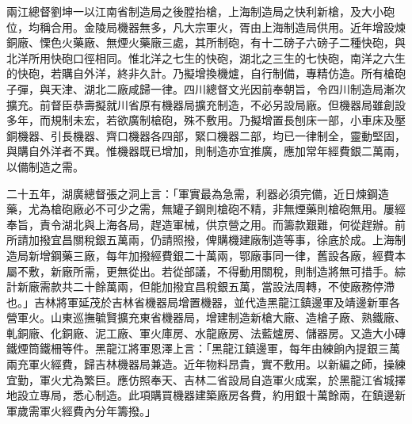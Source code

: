 \begin{pinyinscope}
兩江總督劉坤一以江南省制造局之後膛抬槍，上海制造局之快利新槍，及大小砲位，均稱合用。金陵局機器無多，凡大宗軍火，胥由上海制造局供用。近年增設煉銅廠、慄色火藥廠、無煙火藥廠三處，其所制砲，有十二磅子六磅子二種快砲，與北洋所用快砲口徑相同。惟北洋之七生的快砲，湖北之三生的七快砲，南洋之六生的快砲，若購自外洋，終非久計。乃擬增換機爐，自行制備，專精仿造。所有槍砲子彈，與天津、湖北二廠咸歸一律。四川總督文光因前奉朝旨，令四川制造局漸次擴充。前督臣恭壽擬就川省原有機器局擴充制造，不必另設局廠。但機器局雖創設多年，而規制未宏，若欲廣制槍砲，殊不敷用。乃擬增置長刨床一部，小車床及壓銅機器、引長機器、齊口機器各四部，緊口機器二部，均已一律制全，靈動堅固，與購自外洋者不異。惟機器既已增加，則制造亦宜推廣，應加常年經費銀二萬兩，以備制造之需。

二十五年，湖廣總督張之洞上言：「軍實最為急需，利器必須完備，近日煉鋼造藥，尤為槍砲廠必不可少之需，無罐子鋼則槍砲不精，非無煙藥則槍砲無用。屢經奉旨，責令湖北與上海各局，趕造軍械，供京營之用。而籌款艱難，何從趕辦。前所請加撥宜昌關稅銀五萬兩，仍請照撥，俾購機建廠制造等事，徐底於成。上海制造局新增鋼藥三廠，每年加撥經費銀二十萬兩，鄂廠事同一律，舊設各廠，經費本屬不敷，新廠所需，更無從出。若從部議，不得動用關稅，則制造將無可措手。綜計新廠需款共二十餘萬兩，但能加撥宜昌稅銀五萬，當設法周轉，不使廠務停滯也。」吉林將軍延茂於吉林省機器局增置機器，並代造黑龍江鎮邊軍及靖邊新軍各營軍火。山東巡撫毓賢擴充東省機器局，增建制造新槍大廠、造槍子廠、熟鐵廠、軋銅廠、化銅廠、泥工廠、軍火庫房、水龍廠房、法藍爐房、儲器房。又造大小磚鐵煙筒鐵柵等件。黑龍江將軍恩澤上言：「黑龍江鎮邊軍，每年由練餉內提銀三萬兩充軍火經費，歸吉林機器局兼造。近年物料昂貴，實不敷用。以新編之師，操練宜勤，軍火尤為繁巨。應仿照奉天、吉林二省設局自造軍火成案，於黑龍江省城擇地設立專局，悉心制造。此項購買機器建築廠房各費，約用銀十萬餘兩，在鎮邊新軍歲需軍火經費內分年籌撥。」


\end{pinyinscope}
